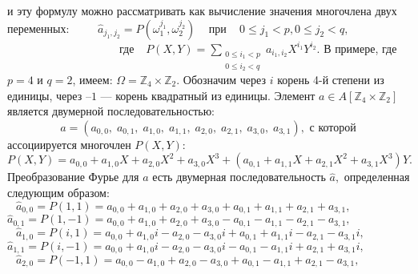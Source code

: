 \documentclass{../../template/mai_book}
\begin{document}
и эту формулу можно рассматривать как вычисление значения многочлена двух переменных: \newline \newline \indent
$\;\;\;\;\;\;\;\;\hat a_{j_1 , j_2} = P(\omega_1^{j_1},\omega_2^{j_2})\;\;\;$ при $\;\;\; 0 \le j_1 < p, 0 \le j_2 < q,$ \newline \newline \indent
$\;\;\;\;\;\;\;\;\;\;\;\;\;\;\;\;\;\;\;\;\;\;\;\;\;\;\;\;\;\;\;\;\;\;\;\;$где $\;\;\,P(X,Y) = \sum \limits_{\substack{0 \le i_1 < p \\ 0 \le i_2 < q}}a_{i_1 , i_2}X^{i_1}Y^{i_2}$. \newline \newline 
В примере, где $p = 4$ и $q = 2$, имеем: $\Omega = \mathds{Z}_4 \times \mathds{Z}_2.$ Обозначим через $i$ корень 4-й степени из единицы, через --$1$ --- корень квадратный из единицы. Элемент $a \in A[\mathds{Z}_4 \times \mathds{Z}_2]$ является двумерной последовательностью: \newline \newline \indent
$\;\;\;\;\;\;\;\;\;\;\;\;\;\;\;\;\;a = (a_{0,0},\;a_{0,1},\;a_{1,0},\;a_{1,1},\;a_{2,0},\;a_{2,1},\;a_{3,0},\;a_{3,1}),$ \newline \newline
с которой ассоциируется многочлен $P(X,Y):$ \newline \newline 
$P(X,Y) = a_{0,0} + a_{1,0}X + a_{2,0}X^2 + a_{3,0}X^3 + (a_{0,1} + a_{1,1}X + a_{2,1}X^2 + a_{3,1}X^3)Y.$ \newline \newline
Преобразование Фурье для $a$ есть двумерная последовательность $\hat a,$
\newpage
\noindent
определенная следующим образом: \newline \newline \indent
$\;\;\:\hat a_{0,0} = P(1,1) = a_{0,0} + a_{1,0} + a_{2,0} + a_{3,0} + a_{0,1} + a_{1,1} + a_{2,1} + a_{3,1},$ \newline \indent
$\hat a_{0,1} = P(1,-1) = a_{0,0} + a_{1,0} + a_{2,0} + a_{3,0} - a_{0,1} - a_{1,1} - a_{2,1} - a_{3,1},$ \newline \indent
$\;\;\:\hat a_{1,0} = P(i,1) = a_{0,0} + a_{1,0}i - a_{2,0} - a_{3,0}i + a_{0,1} + a_{1,1}i - a_{2,1} - a_{3,1}i,$ \newline \indent
$\hat a_{1,1} = P(i,-1) = a_{0,0} + a_{1,0}i - a_{2,0} - a_{3,0}i - a_{0,1} - a_{1,1}i + a_{2,1} + a_{3,1}i,$ \newline \indent
$\;\;\:\hat a_{2,0} = P(-1,1) = a_{0,0} - a_{1,0} + a_{2,0} - a_{3,0} + a_{0,1} - a_{1,1} + a_{2,1} - a_{3,1},$ \newline \indent
\end{document}
